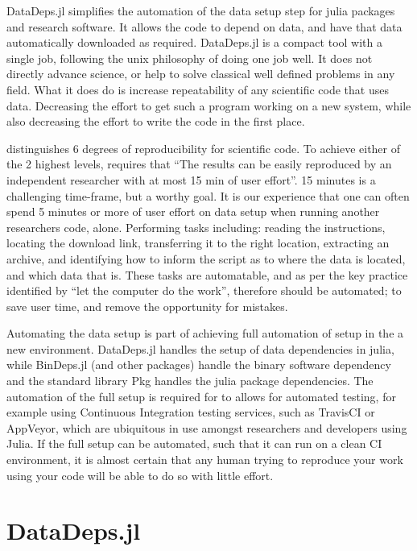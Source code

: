 \documentclass[twoside,11pt]{article}
\begin{document}
DataDeps.jl simplifies the automation of the data setup step for julia \citep{Julia}  packages and research software.
It allows the code to depend on data, and have that data automatically downloaded as required.
DataDeps.jl is a compact tool with a single job, following the unix philosophy of doing one job well.
It does not directly advance science, or help to solve classical well defined problems in any field.
What it does do is increase repeatability of any scientific code that uses data.
Decreasing the effort to get such a program working on a new system,
while also decreasing the effort to write the code in the first place.


\citet{VabdewakkeReproduceableResearch} distinguishes 6 degrees of reproducibility for scientific code.
To achieve either of the 2 highest levels,
requires that ``The results can be easily reproduced by an independent researcher with at most 15 min of user effort''.
15 minutes is a challenging time-frame, but a worthy goal.
It is our experience that one can often spend 5 minutes or more of user effort on data setup when running another researchers code, alone.
Performing tasks including: reading the instructions, locating the download link, transferring it to the right location, extracting an archive, and identifying how to inform the script as to where the data is located, and which data that is.
These tasks are automatable, and as per the key practice identified by \citet{10.1371/journal.pbio.1001745} ``let the computer do the work'', therefore should be automated; to save user time, and remove the opportunity for mistakes.


Automating the data setup is part of achieving full automation of setup in the a new environment.
DataDeps.jl handles the setup of data dependencies in julia, while BinDeps.jl (and other packages) handle the binary software dependency and the standard library Pkg handles the julia package dependencies.
The automation of the full setup is required for to allows for automated testing, for example using Continuous Integration testing services, such as TravisCI or AppVeyor, which are ubiquitous in use  amongst researchers and developers using Julia.
If the full setup can be automated, such that it can run on a clean CI environment,
it is almost certain that any human trying to reproduce your work 
using your code will be able to do so with little effort.




\section{DataDeps.jl}
\end{document}

